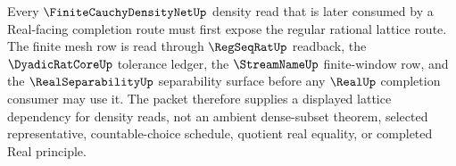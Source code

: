 Every $\FiniteCauchyDensityNetUp$ density read that is later consumed by a Real-facing completion route must first expose the regular rational lattice route. The finite mesh row is read through $\RegSeqRatUp$ readback, the $\DyadicRatCoreUp$ tolerance ledger, the $\StreamNameUp$ finite-window row, and the $\RealSeparabilityUp$ separability surface before any $\RealUp$ completion consumer may use it. The packet therefore supplies a displayed lattice dependency for density reads, not an ambient dense-subset theorem, selected representative, countable-choice schedule, quotient real equality, or completed Real principle.
